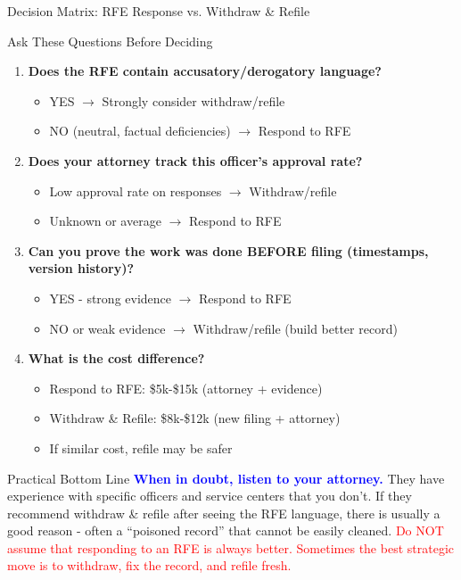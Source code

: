 \documentclass[11pt]{beamer}
\begin{document}
	\begin{frame}{Decision Matrix: RFE Response vs. Withdraw \& Refile}
		\scriptsize
		\begin{block}{Ask These Questions Before Deciding}
			\begin{enumerate}
				\item \textbf{Does the RFE contain accusatory/derogatory language?} 
				\begin{itemize}
					\item YES $\rightarrow$ Strongly consider withdraw/refile
					\item NO (neutral, factual deficiencies) $\rightarrow$ Respond to RFE
				\end{itemize}
				\item \textbf{Does your attorney track this officer's approval rate?}
				\begin{itemize}
					\item Low approval rate on responses $\rightarrow$ Withdraw/refile
					\item Unknown or average $\rightarrow$ Respond to RFE
				\end{itemize}
				\item \textbf{Can you prove the work was done BEFORE filing (timestamps, version history)?}
				\begin{itemize}
					\item YES - strong evidence $\rightarrow$ Respond to RFE
					\item NO or weak evidence $\rightarrow$ Withdraw/refile (build better record)
				\end{itemize}
				\item \textbf{What is the cost difference?}
				\begin{itemize}
					\item Respond to RFE: \$5k-\$15k (attorney + evidence)
					\item Withdraw \& Refile: \$8k-\$12k (new filing + attorney)
					\item If similar cost, refile may be safer
				\end{itemize}
			\end{enumerate}
		\end{block}
		
		\begin{block}{Practical Bottom Line}
			\textcolor{blue}{\textbf{When in doubt, listen to your attorney.}} They have experience with specific officers and service centers that you don't. If they recommend withdraw \& refile after seeing the RFE language, there is usually a good reason - often a ``poisoned record'' that cannot be easily cleaned.
			\vspace{0.2cm}
			\textcolor{red}{Do NOT assume that responding to an RFE is always better. Sometimes the best strategic move is to withdraw, fix the record, and refile fresh.}
		\end{block}
	\end{frame}
	
\end{document}

